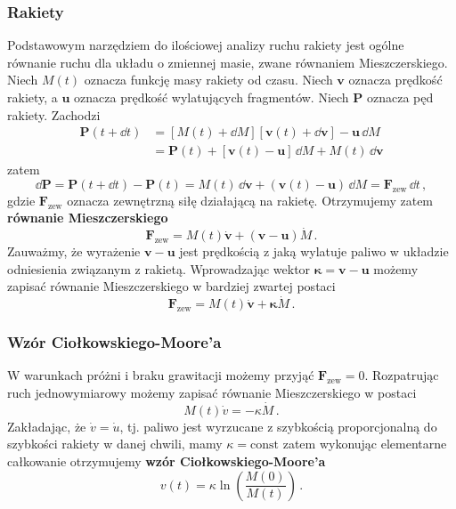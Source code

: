 \documentclass[../main.tex]{subfiles}
\begin{document}
\subsubsection{Rakiety}
Podstawowym narzędziem do ilościowej analizy ruchu rakiety jest ogólne równanie ruchu dla układu o
zmiennej masie, zwane równaniem Mieszczerskiego. Niech \(M(t)\) oznacza funkcję masy rakiety od
czasu. Niech \(\mathbf{v}\) oznacza prędkość rakiety, a \(\mathbf{u}\) oznacza prędkość wylatujących
fragmentów. Niech \(\mathbf{P}\) oznacza pęd rakiety. Zachodzi
\begin{equation*}
\begin{split}
    \mathbf{P}(t+\dd t)&=[M(t)+\dd{M}][\mathbf{v}(t)+\dd{\mathbf{v}}]-\mathbf{u}\,\dd M\\
    &=\mathbf{P}(t)+[\mathbf{v}(t)-\mathbf{u}]\,\dd M+M(t)\,\dd{\mathbf{v}}
\end{split}
\end{equation*}
zatem
\begin{equation*}
    \dd\mathbf{P}=\mathbf{P}(t+\dd t)-\mathbf{P}(t)=M(t)\,\dd\mathbf{v}+(\mathbf{v}(t)-\mathbf{u})\,\dd M=\mathbf{F}_\text{zew}\,\dd t\,,
\end{equation*}
gdzie \(\mathbf{F}_\text{zew}\) oznacza zewnętrzną siłę działającą na rakietę. Otrzymujemy zatem
\textbf{równanie Mieszczerskiego}
\begin{equation*}
    \mathbf{F}_\text{zew}=M(t)\dot{\mathbf{v}}+(\mathbf{v}-\mathbf{u})\dot M\,.
\end{equation*}
Zauważmy, że wyrażenie \(\mathbf{v}-\mathbf{u}\) jest prędkością z jaką wylatuje paliwo w układzie
odniesienia związanym z rakietą. Wprowadzając wektor \(\boldsymbol{\kappa}=\mathbf{v}-\mathbf{u}\)
możemy zapisać równanie Mieszczerskiego w bardziej zwartej postaci
\begin{equation*}
    \mathbf{F}_\text{zew}=M(t)\dot{\mathbf{v}}+\boldsymbol{\kappa}\dot M\,.
\end{equation*}
\subsubsection*{Wzór Ciołkowskiego-Moore'a}
W warunkach próżni i braku grawitacji możemy przyjąć \(\mathbf{F}_\text{zew}=0\). Rozpatrując ruch
jednowymiarowy możemy zapisać równanie Mieszczerskiego w postaci
\begin{equation*}
    M(t)\dot v=-\kappa \dot M\,.
\end{equation*}
Zakładając, że \(\dot v=\dot u\), tj. paliwo jest wyrzucane z szybkością proporcjonalną do szybkości
rakiety w danej chwili, mamy \(\kappa=\text{const}\) zatem wykonując elementarne całkowanie
otrzymujemy \textbf{wzór Ciołkowskiego-Moore'a}
\begin{equation*}
    v(t)=\kappa\ln\left(\frac{M(0)}{M(t)}\right)\,.
\end{equation*}
\end{document}
